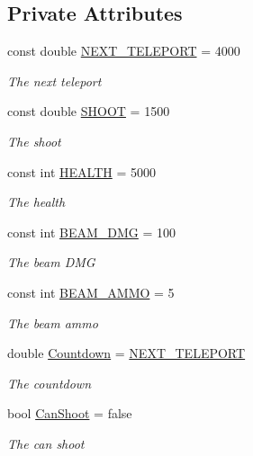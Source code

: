 \subsection*{Private Attributes}
\begin{DoxyCompactItemize}
\item 
const double \hyperlink{classXaria_1_1Enemies_1_1Boss1_ac916e1349e4fb79ac96167fdb7eb508a}{N\+E\+X\+T\+\_\+\+T\+E\+L\+E\+P\+O\+RT} = 4000
\begin{DoxyCompactList}\small\item\em The next teleport \end{DoxyCompactList}\item 
const double \hyperlink{classXaria_1_1Enemies_1_1Boss1_ab4e7aea397f0d4d722c7cac36bf40197}{S\+H\+O\+OT} = 1500
\begin{DoxyCompactList}\small\item\em The shoot \end{DoxyCompactList}\item 
const int \hyperlink{classXaria_1_1Enemies_1_1Boss1_ac1e5b15413592a0dce2e9f80db7d628e}{H\+E\+A\+L\+TH} = 5000
\begin{DoxyCompactList}\small\item\em The health \end{DoxyCompactList}\item 
const int \hyperlink{classXaria_1_1Enemies_1_1Boss1_a1a48031798f8b98baaac0af0d3c4c4a5}{B\+E\+A\+M\+\_\+\+D\+MG} = 100
\begin{DoxyCompactList}\small\item\em The beam D\+MG \end{DoxyCompactList}\item 
const int \hyperlink{classXaria_1_1Enemies_1_1Boss1_ad85f92fd4e33ef534afaaa61eae052a0}{B\+E\+A\+M\+\_\+\+A\+M\+MO} = 5
\begin{DoxyCompactList}\small\item\em The beam ammo \end{DoxyCompactList}\item 
double \hyperlink{classXaria_1_1Enemies_1_1Boss1_a6d1aae7e6051daf6d76165d25a1a03d6}{Countdown} = \hyperlink{classXaria_1_1Enemies_1_1Boss1_ac916e1349e4fb79ac96167fdb7eb508a}{N\+E\+X\+T\+\_\+\+T\+E\+L\+E\+P\+O\+RT}
\begin{DoxyCompactList}\small\item\em The countdown \end{DoxyCompactList}\item 
bool \hyperlink{classXaria_1_1Enemies_1_1Boss1_a7e11f0ec442ef552077c1fae0ce92215}{Can\+Shoot} = false
\begin{DoxyCompactList}\small\item\em The can shoot \end{DoxyCompactList}\end{DoxyCompactItemize}
